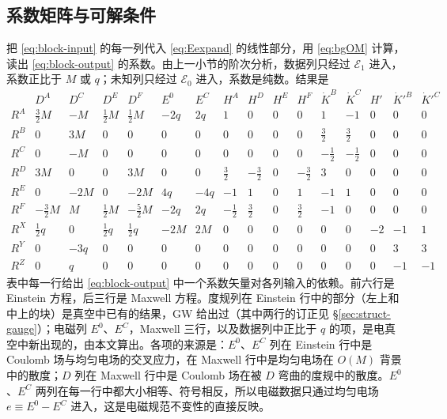 \documentclass[11pt,a4paper]{ctexart}
\begin{document}
\subsection{系数矩阵与可解条件}\label{sec:struct-matrix}

把 \eqref{eq:block-input} 的每一列代入 \eqref{eq:Eexpand} 的线性部分，用 \eqref{eq:bgOM} 计算，读出 \eqref{eq:block-output} 的系数。由上一小节的阶次分析，数据列只经过 $\mathcal E_1$ 进入，系数正比于 $M$ 或 $q$；未知列只经过 $\mathcal E_0$ 进入，系数是纯数。结果是
{\small\setlength{\arraycolsep}{2.5pt}
\begin{equation}
\begin{array}{c|rrrrrr|rrrrrrrrr}
 & D^A & D^C & D^E & D^F & E^0 & E^C & H^A & H^D & H^E & H^F & \dot K^B & \dot K^C & H' & \dot K'^B & \dot K'^C\\\hline
R^A & \tfrac32M & -M & \tfrac12M & \tfrac12M & -2q & 2q & 1&0&0&0&1&-1&0&0&0\\
R^B & 0 & 3M & 0&0&0&0& 0&0&0&0&\tfrac32&\tfrac32&0&0&0\\
R^C & 0 & -M & 0&0&0&0& 0&0&0&0&-\tfrac12&-\tfrac12&0&0&0\\
R^D & 3M & 0 & 0 & 3M &0&0& \tfrac32&-\tfrac32&0&-\tfrac32&3&0&0&0&0\\
R^E & 0 & -2M & 0 & -2M & 4q & -4q & -1&1&0&1&-1&1&0&0&0\\
R^F & -\tfrac32M & M & \tfrac12M & -\tfrac52M & -2q & 2q & -\tfrac12&\tfrac32&0&\tfrac32&-1&0&0&0&0\\\hline
R^X & \tfrac12q & 0 & \tfrac12q & \tfrac12q & -2M & 2M & 0&0&0&0&0&0&-2&-1&1\\
R^Y & 0 & -3q & 0&0&0&0& 0&0&0&0&0&0&0&3&3\\
R^Z & 0 & q & 0&0&0&0& 0&0&0&0&0&0&0&-1&-1
\end{array}
\label{eq:matrix}
\end{equation}}
表中每一行给出 \eqref{eq:block-output} 中一个系数矢量对各列输入的依赖。前六行是 Einstein 方程，后三行是 Maxwell 方程。度规列在 Einstein 行中的部分（左上和中上的块）是真空中已有的结果，GW 给出过（其中两行的订正见 \S\ref{sec:struct-gauge}）；电磁列 $E^0$、$E^C$，Maxwell 三行，以及数据列中正比于 $q$ 的项，是电真空中新出现的，由本文算出。各项的来源是：$E^0$、$E^C$ 列在 Einstein 行中是 Coulomb 场与均匀电场的交叉应力，在 Maxwell 行中是均匀电场在 $O(M)$ 背景中的散度；$D$ 列在 Maxwell 行中是 Coulomb 场在被 $D$ 弯曲的度规中的散度。$E^0$、$E^C$ 两列在每一行中都大小相等、符号相反，所以电磁数据只通过均匀电场 $e\equiv E^0-E^C$ 进入，这是电磁规范不变性的直接反映。
\end{document}
